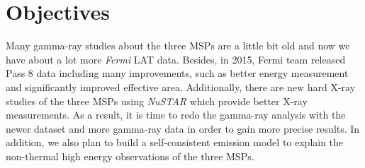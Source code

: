 \documentclass[a4paper, 12pt]{report}
\begin{document}
    
    \begin{table}[!htp]
      \centering
      \vspace{0.5cm}
        \centering
        \caption[Spectra properties of the three MSPs from previous studies.]
          {Spectra properties of the three MSPs from previous studies
          \footnote{http://www.atnf.csiro.au/research/pulsar/psrcat/}
          \citep{0004-637X-787-2-167,J1939_old}.}
        \label{table: previous_spectra_property}
    \end{table}

  \section{Objectives}
    
    Many gamma-ray studies about the three MSPs are a little bit old and now we have about 
    a lot more \textit{Fermi} LAT data. Besides, in 2015, Fermi team released Pass 8 data 
    including many improvements, such as better energy measurement and significantly 
    improved effective area. Additionally, there are new hard X-ray studies of the three 
    MSPs using \textit{NuSTAR} which provide better X-ray measurements.
    As a result, it is time to redo the gamma-ray analysis with the newer dataset and
    more gamma-ray data in order to gain more precise results. In addition, we also plan to 
    build a self-consistent emission model to explain the non-thermal high energy
    observations of the three MSPs. 
\end{document}
